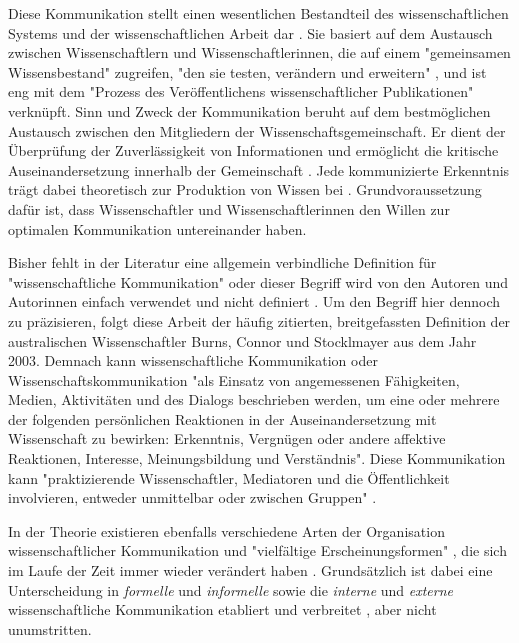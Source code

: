 Diese Kommunikation stellt einen wesentlichen Bestandteil des wissenschaftlichen Systems und der wissenschaftlichen Arbeit dar \cite{Garvey_2014} \cite[:63]{Luhmann_1998}. Sie basiert auf dem Austausch zwischen Wissenschaftlern und Wissenschaftlerinnen, die auf einem "gemeinsamen Wissensbestand" zugreifen, "den sie testen, verändern und erweitern" \cite{Glaeser_2007}, und ist eng mit dem "Prozess des Veröffentlichens wissenschaftlicher Publikationen" \cite{Weller_2011} verknüpft. Sinn und Zweck der Kommunikation beruht auf dem bestmöglichen Austausch zwischen den Mitgliedern der Wissenschaftsgemeinschaft. Er dient der Überprüfung der Zuverlässigkeit von Informationen und ermöglicht die kritische Auseinandersetzung innerhalb der Gemeinschaft \cite{Fox_1983}. Jede kommunizierte Erkenntnis trägt dabei theoretisch zur Produktion von Wissen bei \cite{Kaden_2009}. Grundvoraussetzung dafür ist, dass Wissenschaftler und Wissenschaftlerinnen den Willen zur optimalen Kommunikation untereinander haben.

Bisher fehlt in der Literatur eine allgemein verbindliche Definition für "wissenschaftliche Kommunikation" oder dieser Begriff wird von den Autoren und Autorinnen einfach verwendet und nicht definiert \cite[:2]{Seidenfaden_2005}. Um den Begriff hier dennoch zu präzisieren, folgt diese Arbeit der häufig zitierten, breitgefassten Definition der australischen Wissenschaftler Burns, Connor und Stocklmayer aus dem Jahr 2003. Demnach kann wissenschaftliche Kommunikation oder Wissenschaftskommunikation "als Einsatz von angemessenen Fähigkeiten, Medien, Aktivitäten und des Dialogs beschrieben werden, um eine oder mehrere der folgenden persönlichen Reaktionen in der Auseinandersetzung mit Wissenschaft zu bewirken: Erkenntnis, Vergnügen oder andere affektive Reaktionen, Interesse, Meinungsbildung und Verständnis". Diese Kommunikation kann "praktizierende Wissenschaftler, Mediatoren und die Öffentlichkeit involvieren, entweder unmittelbar oder zwischen Gruppen" \cite[:191]{Burns_2003}.

In der Theorie existieren ebenfalls verschiedene Arten der Organisation wissenschaftlicher Kommunikation und "vielfältige Erscheinungsformen" \cite{Graefen_2007}, die sich im Laufe der Zeit immer wieder verändert haben \cite{Konneker_2013} \cite{Hagner_2015}. Grundsätzlich ist dabei eine Unterscheidung in \textit{formelle} und \textit{informelle} sowie die \textit{interne} und \textit{externe} wissenschaftliche Kommunikation etabliert und verbreitet \cite{Seidenfaden_2005}, aber nicht unumstritten.

